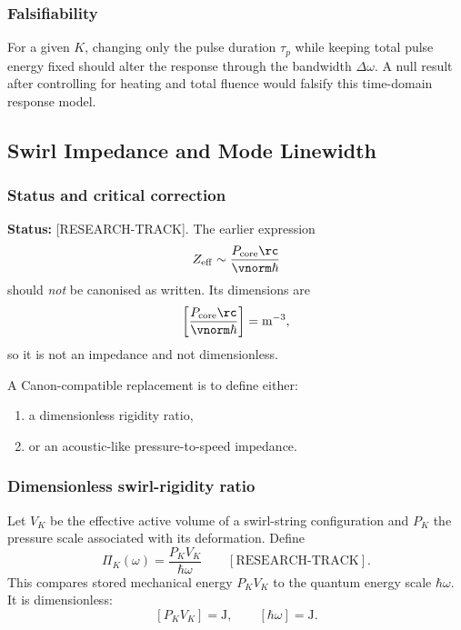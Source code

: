     \subsubsection*{Falsifiability}
        
        For a given \(K\), changing only the pulse duration \(\tau_p\) while keeping total pulse energy fixed should alter the response through the bandwidth \(\Delta\omega\). A null result after controlling for heating and total fluence would falsify this time-domain response model.

\subsection{Swirl Impedance and Mode Linewidth}
    \label{app:swirl-impedance-linewidth}
    
    \subsubsection*{Status and critical correction}
        
        \noindent
        \textbf{Status:} [RESEARCH-TRACK].
        The earlier expression
        \[
            Z_{\mathrm{eff}} \sim \frac{P_{\mathrm{core}}\rc}{\vnorm\hbar}
        \]
        should \emph{not} be canonised as written. Its dimensions are
        \[
            \left[
                \frac{P_{\mathrm{core}}\rc}{\vnorm\hbar}
            \right]
            =
            \mathrm{m^{-3}},
        \]
        so it is not an impedance and not dimensionless.
        
        A Canon-compatible replacement is to define either:
        
        \begin{enumerate}
            \item a dimensionless rigidity ratio,
            \item or an acoustic-like pressure-to-speed impedance.
        \end{enumerate}
    
    \subsubsection*{Dimensionless swirl-rigidity ratio}
        
        Let \(V_K\) be the effective active volume of a swirl-string configuration and \(P_K\) the pressure scale associated with its deformation. Define
        \begin{equation}
            \boxed{
                \Pi_K(\omega)
                =
                \frac{P_K V_K}{\hbar\omega}
            }
            \qquad
            [\mathrm{RESEARCH\text{-}TRACK}].
            \label{eq:dimensionless_swirl_rigidity}
        \end{equation}
        This compares stored mechanical energy \(P_KV_K\) to the quantum energy scale \(\hbar\omega\). It is dimensionless:
        \[
            [P_KV_K]=\mathrm{J},
            \qquad
            [\hbar\omega]=\mathrm{J}.
        \]
    
